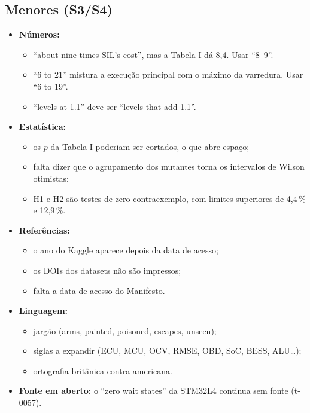 \documentclass[10pt,a4paper]{article}
\begin{document}
\subsection{Menores (S3/S4)}
\begin{itemize}
\item \textbf{Números:}
  \begin{itemize}
  \item ``about nine times SIL's cost'', mas a Tabela I dá 8,4. Usar ``8--9''.
  \item ``6 to 21'' mistura a execução principal com o máximo da varredura. Usar ``6 to 19''.
  \item ``levels at 1.1'' deve ser ``levels that add 1.1''.
  \end{itemize}
\item \textbf{Estatística:}
  \begin{itemize}
  \item os $p$ da Tabela I poderiam ser cortados, o que abre espaço;
  \item falta dizer que o agrupamento dos mutantes torna os intervalos de Wilson otimistas;
  \item H1 e H2 são testes de zero contraexemplo, com limites superiores de 4,4\,\% e 12,9\,\%.
  \end{itemize}
\item \textbf{Referências:}
  \begin{itemize}
  \item o ano do Kaggle aparece depois da data de acesso;
  \item os DOIs dos datasets não são impressos;
  \item falta a data de acesso do Manifesto.
  \end{itemize}
\item \textbf{Linguagem:}
  \begin{itemize}
  \item jargão (arms, painted, poisoned, escapes, unseen);
  \item siglas a expandir (ECU, MCU, OCV, RMSE, OBD, SoC, BESS, ALU…);
  \item ortografia britânica contra americana.
  \end{itemize}
\item \textbf{Fonte em aberto:} o ``zero wait states'' da STM32L4 continua sem fonte (t-0057).
\end{itemize}
\end{document}
